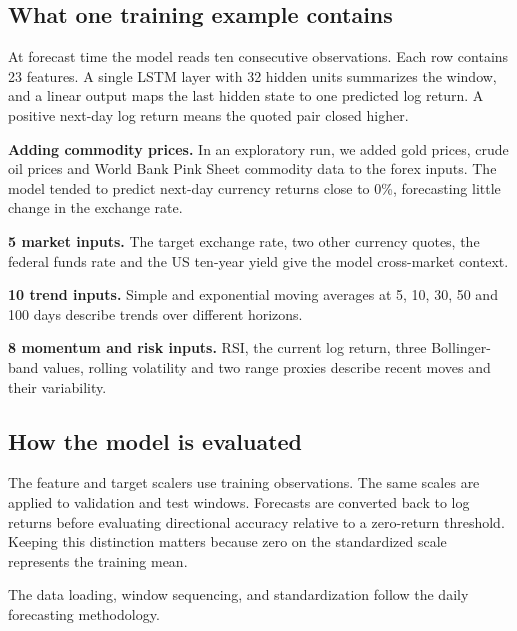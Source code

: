 \documentclass[12pt,a4paper,twoside,openany]{report}
\begin{document}
\subsection*{What one training example contains}
At forecast time the model reads ten consecutive observations. Each row contains 23 features. A single LSTM layer with 32 hidden units summarizes the window, and a linear output maps the last hidden state to one predicted log return. A positive next-day log return means the quoted pair closed higher.\par

\textbf{Adding commodity prices.} In an exploratory run, we added gold prices, crude oil prices and World Bank Pink Sheet commodity data to the forex inputs. The model tended to predict next-day currency returns close to 0\%, forecasting little change in the exchange rate.\par
\textbf{5 market inputs.} The target exchange rate, two other currency quotes, the federal funds rate and the US ten-year yield give the model cross-market context.\par
\textbf{10 trend inputs.} Simple and exponential moving averages at 5, 10, 30, 50 and 100 days describe trends over different horizons.\par
\textbf{8 momentum and risk inputs.} RSI, the current log return, three Bollinger-band values, rolling volatility and two range proxies describe recent moves and their variability.\par
\subsection*{How the model is evaluated}
The feature and target scalers use training observations. The same scales are applied to validation and test windows. Forecasts are converted back to log returns before evaluating directional accuracy relative to a zero-return threshold. Keeping this distinction matters because zero on the standardized scale represents the training mean.\par
The data loading, window sequencing, and standardization follow the daily forecasting methodology.\par
\end{document}
